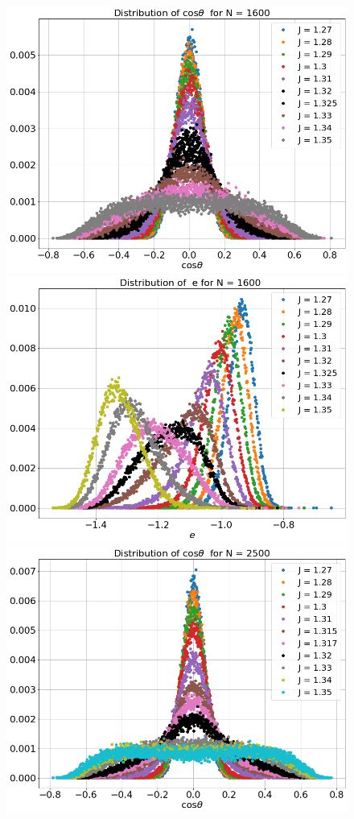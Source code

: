   \begin{figure}[H]
 	\centering
 	\includegraphics[scale=0.25]{Images/distr_cos_1600.png}
 	\includegraphics[scale=0.25]{Images/distr_energy_1600.png} \\
 	\includegraphics[scale=0.25]{Images/distr_cos_2500.png}

\end{figure}
